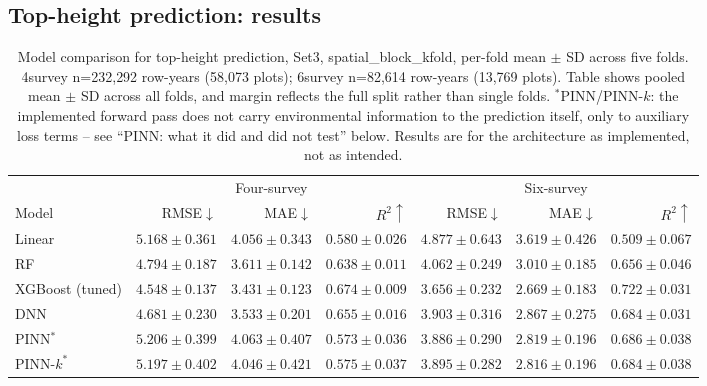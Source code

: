\documentclass[logo,msc,ai]{infthesis}           %
\begin{document}
\subsection{Top-height prediction: results}
\begin{table}[!htbp]
\centering
\scriptsize
\setlength{\tabcolsep}{4pt}
\renewcommand{\arraystretch}{1.2}
\begin{tabular}{lrrrrrr}
\toprule
& \multicolumn{3}{c}{Four-survey} & \multicolumn{3}{c}{Six-survey} \\
\cmidrule(lr){2-4} \cmidrule(lr){5-7}
Model & RMSE${\downarrow}$ & MAE${\downarrow}$ & $R^2{\uparrow}$ & RMSE${\downarrow}$ & MAE${\downarrow}$ & $R^2{\uparrow}$ \\
\midrule
Linear & $5.168{\pm}0.361$ & $4.056{\pm}0.343$ & $0.580{\pm}0.026$ & $4.877{\pm}0.643$ & $3.619{\pm}0.426$ & $0.509{\pm}0.067$ \\
RF & $4.794{\pm}0.187$ & $3.611{\pm}0.142$ & $0.638{\pm}0.011$ & $4.062{\pm}0.249$ & $3.010{\pm}0.185$ & $0.656{\pm}0.046$ \\
XGBoost (tuned) & $\mathbf{4.548{\pm}0.137}$ & $\mathbf{3.431{\pm}0.123}$ & $\mathbf{0.674{\pm}0.009}$ & $\mathbf{3.656{\pm}0.232}$ & $\mathbf{2.669{\pm}0.183}$ & $\mathbf{0.722{\pm}0.031}$ \\
DNN & $4.681{\pm}0.230$ & $3.533{\pm}0.201$ & $0.655{\pm}0.016$ & $3.903{\pm}0.316$ & $2.867{\pm}0.275$ & $0.684{\pm}0.031$ \\
PINN$^*$ & $5.206{\pm}0.399$ & $4.063{\pm}0.407$ & $0.573{\pm}0.036$ & $3.886{\pm}0.290$ & $2.819{\pm}0.196$ & $0.686{\pm}0.038$ \\
PINN-$k^*$ & $5.197{\pm}0.402$ & $4.046{\pm}0.421$ & $0.575{\pm}0.037$ & $3.895{\pm}0.282$ & $2.816{\pm}0.196$ & $0.684{\pm}0.038$ \\
\bottomrule
\end{tabular}
\caption{Model comparison for top-height prediction, Set3, spatial\_block\_kfold,
per-fold mean $\pm$ SD across five folds. 4survey n=232{,}292 row-years (58{,}073
plots); 6survey n=82{,}614 row-years (13{,}769 plots). Table shows pooled mean $\pm$ SD across all folds, and margin reflects the full split rather than single folds.
$^*$PINN/PINN-$k$: the implemented forward pass does not carry environmental
information to the prediction itself, only to auxiliary loss terms -- see
``PINN: what it did and did not test'' below. Results are for the architecture
as implemented, not as intended.}
\label{tab:results-rq1}
\end{table}
\end{document}
